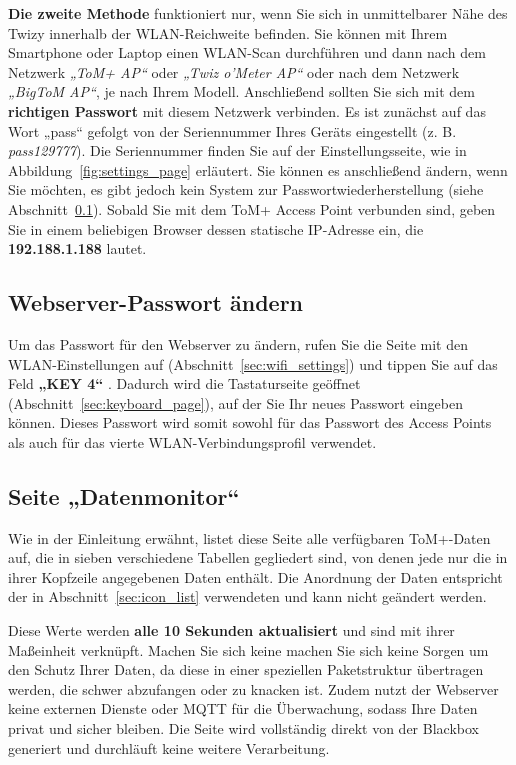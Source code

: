 \textbf{Die zweite Methode} funktioniert nur, wenn Sie sich in unmittelbarer Nähe des Twizy innerhalb der WLAN-Reichweite befinden.
Sie können mit Ihrem Smartphone oder Laptop einen WLAN-Scan durchführen und dann nach dem Netzwerk
\textit{„ToM+ AP“} oder \textit{„Twiz o'Meter AP“} oder nach dem Netzwerk \textit{„BigToM AP“}, je nach Ihrem Modell. 
Anschließend sollten Sie sich mit dem \textbf{richtigen Passwort} mit diesem Netzwerk verbinden. Es ist zunächst 
auf das Wort „pass“ gefolgt von der Seriennummer Ihres Geräts eingestellt (z. B. \textit{pass129777}).
Die Seriennummer finden Sie auf der Einstellungsseite, wie in Abbildung~\ref{fig:settings_page} erläutert. 
Sie können es anschließend ändern, wenn Sie möchten, es gibt jedoch kein System zur Passwortwiederherstellung (siehe Abschnitt~\ref{sec:web_change_password}).
Sobald Sie mit dem ToM+ Access Point verbunden sind, geben Sie in einem beliebigen Browser dessen statische IP-Adresse ein, die \textbf{192.188.1.188} lautet.


\subsection{Webserver-Passwort ändern}
\label{sec:web_change_password}

Um das Passwort für den Webserver zu ändern, rufen Sie die Seite mit den WLAN-Einstellungen auf (Abschnitt~\ref{sec:wifi_settings})
und tippen Sie auf das Feld \textbf{„KEY 4“} . Dadurch wird die Tastaturseite geöffnet (Abschnitt~\ref{sec:keyboard_page}), auf der Sie Ihr neues Passwort eingeben können.
Dieses Passwort wird somit sowohl für das Passwort des Access Points als auch für das vierte WLAN-Verbindungsprofil verwendet.


\subsection{Seite „Datenmonitor“}
\label{sec:web_data_monitor}

Wie in der Einleitung erwähnt, listet diese Seite alle verfügbaren ToM+-Daten auf, die in sieben
verschiedene Tabellen gegliedert sind, von denen jede nur die in ihrer Kopfzeile angegebenen Daten enthält. Die
Anordnung der Daten entspricht der in Abschnitt~\ref{sec:icon_list} verwendeten und kann nicht geändert werden.

Diese Werte werden \textbf{alle 10 Sekunden aktualisiert} und sind mit ihrer Maßeinheit verknüpft. Machen Sie sich keine machen Sie sich
keine Sorgen
um den Schutz Ihrer Daten, da diese in einer speziellen Paketstruktur übertragen werden, die
schwer abzufangen oder zu knacken ist. Zudem nutzt der Webserver keine externen
Dienste oder MQTT für die Überwachung, sodass Ihre Daten privat und sicher bleiben. Die Seite wird vollständig
direkt von der Blackbox generiert und durchläuft keine weitere Verarbeitung.

